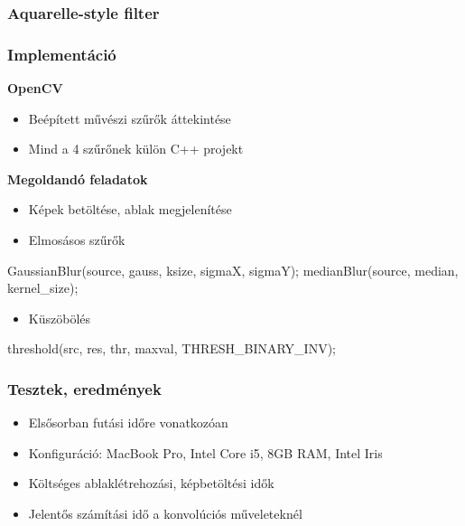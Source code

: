 \documentclass{beamer}
\begin{document}
\begin{frame}[fragile]
\frametitle{Aquarelle-style filter}

\end{frame}

\begin{frame}[fragile]
\frametitle{Implementáció}

\textbf{OpenCV}

\begin{itemize}
\item Beépített művészi szűrők áttekintése
\item Mind a 4 szűrőnek külön C++ projekt
\end{itemize}

\medskip

\textbf{Megoldandó feladatok}

\begin{itemize}
\item Képek betöltése, ablak megjelenítése
\item Elmosásos szűrők
\end{itemize}

\begin{cpp}
GaussianBlur(source, gauss, ksize, sigmaX, sigmaY);
medianBlur(source, median, kernel_size);
\end{cpp}

\begin{itemize}
\item Küszöbölés
\end{itemize}

\begin{cpp}
threshold(src, res, thr, maxval, THRESH_BINARY_INV);
\end{cpp}

\end{frame}


\begin{frame}[fragile]
\frametitle{Tesztek, eredmények}

\begin{itemize}
\item Elsősorban futási időre vonatkozóan
\item Konfiguráció: MacBook Pro, Intel Core i5, 8GB RAM, Intel Iris
\item Költséges ablaklétrehozási, képbetöltési idők
\item Jelentős számítási idő a konvolúciós műveleteknél
\end{itemize}

\end{frame}
\end{document}
